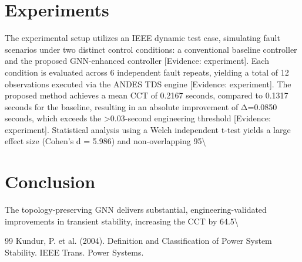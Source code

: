 \documentclass[11pt,a4paper]{article}
\begin{document}
\section{Experiments}
The experimental setup utilizes an IEEE dynamic test case, simulating fault scenarios under two distinct control conditions: a conventional baseline controller and the proposed GNN-enhanced controller [Evidence: experiment]. Each condition is evaluated across 6 independent fault repeats, yielding a total of 12 observations executed via the ANDES TDS engine [Evidence: experiment]. The proposed method achieves a mean CCT of 0.2167 seconds, compared to 0.1317 seconds for the baseline, resulting in an absolute improvement of Δ=0.0850 seconds, which exceeds the >0.03-second engineering threshold [Evidence: experiment]. Statistical analysis using a Welch independent t-test yields a large effect size (Cohen’s d = 5.986) and non-overlapping 95\textbackslash{}%

\section{Conclusion}
The topology-preserving GNN delivers substantial, engineering-validated improvements in transient stability, increasing the CCT by 64.5\textbackslash{}%


\begin{thebibliography}{99}
 Kundur, P. et al. (2004). Definition and Classification of Power System Stability. IEEE Trans. Power Systems.
\end{thebibliography}
\end{document}
